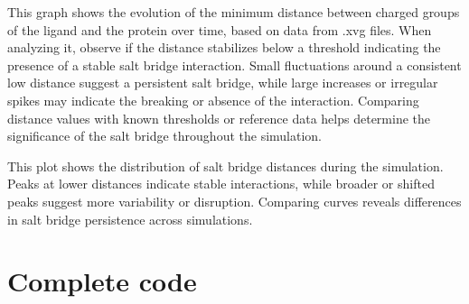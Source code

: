 \documentclass[a4paper,10pt,english]{sphinxmanual}
\let\sphinxpxdimen\pdfpxdimen\else\newdimen\sphinxpxdimen
\begin{document}
\begin{sphinxVerbatim}[commandchars=\\\{\}]
   
\end{sphinxVerbatim}

\noindent{}

\sphinxAtStartPar
{} This graph shows the evolution of the minimum distance between charged groups of the ligand and the protein over time, based on data from .xvg files. When analyzing it, observe if the distance stabilizes below a threshold indicating the presence of a stable salt bridge interaction. Small fluctuations around a consistent low distance suggest a persistent salt bridge, while large increases or irregular spikes may indicate the breaking or absence of the interaction. Comparing distance values with known thresholds or reference data helps determine the significance of the salt bridge throughout the simulation.

\begin{sphinxVerbatim}[commandchars=\\\{\}]
  
\end{sphinxVerbatim}

\noindent{\hspace*{\fill}\sphinxincludegraphics[width=500\sphinxpxdimen]{{Saltbridge_density}.png}\hspace*{\fill}}

\sphinxAtStartPar
{} This plot shows the distribution of salt bridge distances during the simulation. Peaks at lower distances indicate stable interactions, while broader or shifted peaks suggest more variability or disruption. Comparing curves reveals differences in salt bridge persistence across simulations.


\section{Complete code}
\label{\detokenize{Saltbridge:complete-code}}
\begin{sphinxVerbatim}[commandchars=\\\{\}]
 
\end{sphinxVerbatim}
\end{document}
